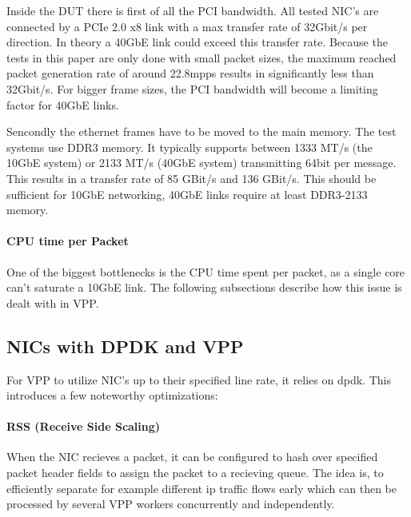 
Inside the DUT there is first of all the PCI bandwidth. All tested
NIC's are connected by a PCIe 2.0 x8 link with a max transfer rate of
32Gbit/s per direction. In theory a 40GbE link could exceed this
transfer rate. Because the tests in this paper are only done with
small packet sizes, the maximum reached packet generation rate of
around 22.8mpps results in significantly less than 32Gbit/s. For
bigger frame sizes, the PCI bandwidth will become a limiting factor
for 40GbE links.


Sencondly the ethernet frames have to be moved to the main memory. The
test systems use DDR3 memory. It typically supports between 1333 MT/s
(the 10GbE system) or 2133 MT/s (40GbE system) transmitting 64bit per
message. This results in a transfer rate of 85 GBit/s and 136 GBit/s.
This should be sufficient for 10GbE networking, 40GbE links
require at least DDR3-2133 memory. 

\paragraph{CPU time per Packet}

One of the biggest bottlenecks is the CPU time spent per packet, as a
single core can't saturate a 10GbE link. The following subsections
describe how this issue is dealt with in VPP.




\subsection{NICs with DPDK and VPP}

For VPP to utilize NIC's up to their specified line rate, it relies on
\Ac{dpdk}. This introduces a few noteworthy optimizations:

\paragraph{RSS (Receive Side Scaling)}

When the NIC recieves a packet, it can be configured to hash over
specified packet header fields to assign the packet to a recieving
queue. The idea is, to efficiently separate for example different ip
traffic flows early which can then be processed by several VPP workers
concurrently and independently. \cite{linguaglossa2017high}

